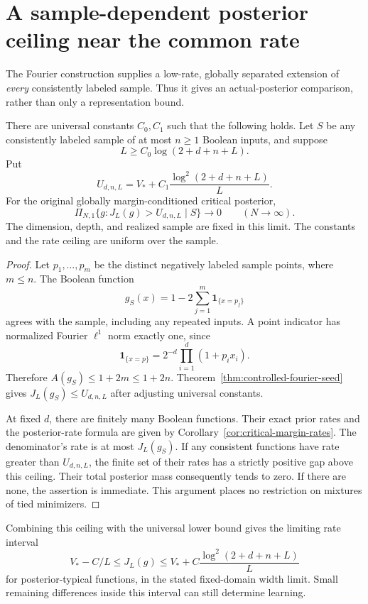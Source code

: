 \section{A sample-dependent posterior ceiling near the common rate}
\label{sec:near-baseline-posterior}

The Fourier construction supplies a low-rate, globally separated
extension of \emph{every} consistently labeled sample. Thus it gives
an actual-posterior comparison, rather than only a representation bound.

\begin{theorem}
\label{thm:near-baseline-posterior-ceiling}
There are universal constants $C_0,C_1$ such that the following holds.
Let $S$ be any consistently labeled sample of at most $n\ge1$ Boolean
inputs, and suppose
\[
 L\ge C_0\log(2+d+n+L).
\]
Put
\[
 U_{d,n,L}=V_*+C_1\frac{\log^2(2+d+n+L)}L.
\]
For the original globally margin-conditioned critical posterior,
\[
 \Pi_{N,1}\{g:J_L(g)>U_{d,n,L}\mid S\}\longrightarrow0
 \qquad(N\to\infty).
\]
The dimension, depth, and realized sample are fixed in this limit.
The constants and the rate ceiling are uniform over the sample.
\end{theorem}

\begin{proof}
Let $p_1,\ldots,p_m$ be the distinct negatively labeled sample points,
where $m\le n$. The Boolean function
\[
 g_S(x)=1-2\sum_{j=1}^m\boldsymbol1_{\{x=p_j\}}
\]
agrees with the sample, including any repeated inputs.
A point indicator has normalized Fourier $\ell^1$ norm exactly one,
since
\[
 \boldsymbol1_{\{x=p\}}=2^{-d}\prod_{i=1}^d(1+p_ix_i).
\]
Therefore $A(g_S)\le1+2m\le1+2n$.
Theorem~\ref{thm:controlled-fourier-seed} gives
$J_L(g_S)\le U_{d,n,L}$ after adjusting universal constants.

At fixed $d$, there are finitely many Boolean functions. Their exact
prior rates and the posterior-rate formula are given by
Corollary~\ref{cor:critical-margin-rates}. The denominator's rate is
at most $J_L(g_S)$. If any consistent functions have rate greater
than $U_{d,n,L}$, the finite set of their rates has a strictly positive
gap above this ceiling. Their total posterior mass consequently tends
to zero. If there are none, the assertion is immediate. This argument
places no restriction on mixtures of tied minimizers.
\end{proof}

Combining this ceiling with the universal lower bound gives the limiting
rate interval
\[
 V_*-C/L\le J_L(g)\le
 V_*+C\frac{\log^2(2+d+n+L)}L
\]
for posterior-typical functions, in the stated fixed-domain width limit.
Small remaining differences inside this interval can still determine
learning.

